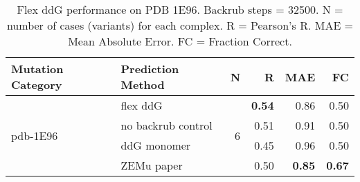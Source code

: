 \begin{table}
  \begin{tabular}{llrrrr}
\toprule
Mutation Category &   Prediction Method &  N &    R &  MAE &   FC \\
\midrule
 \multirow{ 4}{*}{pdb-1E96} & flex ddG & \multirow{ 4}{*}{6} & \textbf{0.54} & 0.86 & 0.50  \\
 & no backrub control & & 0.51 & 0.91 & 0.50  \\
 & ddG monomer & & 0.45 & 0.96 & 0.50  \\
 & ZEMu paper & & 0.50 & \textbf{0.85} & \textbf{0.67}  \\
\bottomrule
\end{tabular}
  \caption[Flex ddG performance on PDB 1E96]{
    Flex ddG performance on PDB 1E96. Backrub steps = 32500. N = number of cases (variants) for each complex. R = Pearson's R. MAE = Mean Absolute Error. FC = Fraction Correct.
  } \label{tab:table-pdb-1E96}
\end{table}
